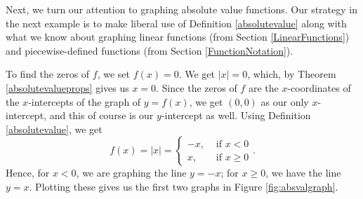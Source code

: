 \pagebreak

Next, we turn our attention to graphing absolute value functions.  Our strategy in the next example is to make liberal use of Definition \ref{absolutevalue} along with what we know about graphing linear functions (from Section \ref{LinearFunctions}) and piecewise-defined functions (from Section \ref{FunctionNotation}).

{
To find the zeros of $f$, we set $f(x)= 0$.  We get $|x|=0$, which, by Theorem \ref{absolutevalueprops} gives us $x=0$.  Since the zeros of $f$ are the $x$-coordinates of the $x$-intercepts of the graph of $y=f(x)$, we get $(0,0)$ as our only $x$-intercept, and this of course is our $y$-intercept as well. Using Definition \ref{absolutevalue}, we get 
\[
 f(x) = |x| =  \begin{cases} -x, & \mbox{ if }  x < 0  \\
 							  x, & \mbox{ if }  x \geq 0
 							  
 				\end{cases}.
\]
Hence, for $x < 0$, we are graphing the line $y = -x$;  for $x \geq 0$, we have the line $y = x$.  Plotting these gives us the first two graphs in Figure \ref{fig:absvalgraph}.



\smallskip

}
